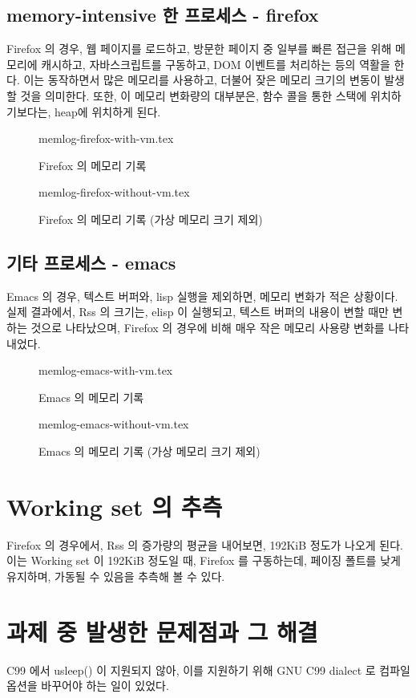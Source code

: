 \documentclass {article}
\begin{document}
\newpage
\subsection{memory-intensive 한 프로세스 - firefox}
Firefox 의 경우, 웹 페이지를 로드하고, 방문한 페이지 중 일부를 빠른 접근을 위해 메모리에 캐시하고, 자바스크립트를 구동하고, DOM 이벤트를 처리하는 등의 역활을 한다. 이는 동작하면서 많은 메모리를 사용하고, 더불어 잦은 메모리 크기의 변동이 발생할 것을 의미한다. 또한, 이 메모리 변화량의 대부분은, 함수 콜을 통한 스택에 위치하기보다는, heap에 위치하게 된다.

\begin {figure}[h]
  \centering
   {memlog-firefox-with-vm.tex}
  \caption {Firefox 의 메모리 기록}
   {memlog-firefox-without-vm.tex}
  \caption {Firefox 의 메모리 기록 (가상 메모리 크기 제외)}
  \label{fig:firefox}
\end {figure}

\newpage
\subsection{기타 프로세스 - emacs}
Emacs 의 경우, 텍스트 버퍼와, lisp 실행을 제외하면, 메모리 변화가 적은 상황이다. 실제 결과에서, Rss 의 크기는, elisp 이 실행되고, 텍스트 버퍼의 내용이 변할 때만 변하는 것으로 나타났으며, Firefox 의 경우에 비해 매우 작은 메모리 사용량 변화를 나타내었다.

\begin {figure}[h]
  \centering
   {memlog-emacs-with-vm.tex}
  \caption {Emacs 의 메모리 기록}
   {memlog-emacs-without-vm.tex}
  \caption {Emacs 의 메모리 기록 (가상 메모리 크기 제외)}
  \label{fig:emacs}
\end {figure}

\newpage
\section {Working set 의 추측}
Firefox 의 경우에서, Rss 의 증가량의 평균을 내어보면, 192KiB 정도가 나오게 된다. 이는 Working set 이 192KiB 정도일 때, Firefox 를 구동하는데, 페이징 폴트를 낮게 유지하며, 가동될 수 있음을 추측해 볼 수 있다.

\section {과제 중 발생한 문제점과 그 해결}
C99 에서 usleep() 이 지원되지 않아, 이를 지원하기 위해 GNU C99 dialect 로 컴파일 옵션을 바꾸어야 하는 일이 있었다.
\end{document}
